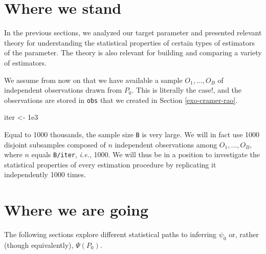 \documentclass[
  11pt,
  openright,twoside]{book}
\newenvironment{Shaded}{\begin{snugshade}}{\end{snugshade}}
\newcommand{\FloatTok}[1]{\textcolor[rgb]{0.00,0.00,0.81}{#1}}
\newcommand{\NormalTok}[1]{#1}
\newcommand{\OtherTok}[1]{\textcolor[rgb]{0.56,0.35,0.01}{#1}}
\theoremstyle{definition}
\theoremstyle{definition}
\theoremstyle{definition}
\theoremstyle{definition}
\theoremstyle{remark}
\begin{document}
\hypertarget{where-we-stand}{%
\section{Where we stand}\label{where-we-stand}}

In the previous sections, we analyzed our target parameter and presented
relevant theory for understanding the statistical properties of certain types
of estimators of the parameter. The theory is also relevant for building and
comparing a variety of estimators.

We assume from now on that we have available a sample \(O_{1}, \ldots, O_{B}\)
of independent observations drawn from \(P_{0}\). This is literally the case!,
and the observations are stored in \texttt{obs} that we created in Section
\ref{exo-cramer-rao}.

\begin{Shaded}
\begin{Highlighting}[]
\NormalTok{iter }\OtherTok{\textless{}{-}} \FloatTok{1e3}
\end{Highlighting}
\end{Shaded}

Equal to 1000 thousands, the sample size \texttt{B} is very large. We will in
fact use 1000 disjoint subsamples composed of \(n\) independent
observations among \(O_{1}, \ldots, O_{B}\), where \(n\) equals \texttt{B/iter}, \emph{i.e.},
1000. We will thus be in a position to investigate the
statistical properties of every estimation procedure by replicating it
independently 1000 times.

\hypertarget{where-we-are-going}{%
\section{Where we are going}\label{where-we-are-going}}

The following sections explore different statistical paths to inferring
\(\psi_{0}\) or, rather (though equivalently), \(\Psi(P_{0})\).
\end{document}
